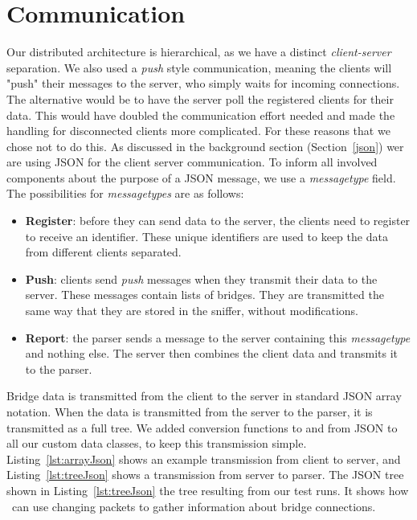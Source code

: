 \section{Communication}
\label{communication}
Our distributed architecture is hierarchical, as we have a distinct \textit{client-server} separation.
We also used a \textit{push} style communication, meaning the clients will "push" their messages to the server, who simply waits for incoming connections.
The alternative would be to have the server poll the registered clients for their data.
This would have doubled the communication effort needed and made the handling for disconnected clients more complicated.
For these reasons that we chose not to do this.
As discussed in the background section (Section~\ref{json}) wer are using JSON for the client server communication.
To inform all involved components about the purpose of a JSON message, we use a \textit{messagetype} field.
The possibilities for \textit{messagetypes} are as follows:
\begin{itemize}
    \item \textbf{Register}: before they can send data to the server, the clients need to register to receive an identifier.
        These unique identifiers are used to keep the data from different clients separated.
    \item \textbf{Push}: clients send \textit{push} messages when they transmit their data to the server.
        These messages contain lists of bridges.
        They are transmitted the same way that they are stored in the sniffer, without modifications.
    \item \textbf{Report}: the parser sends a message to the server containing this \textit{messagetype} and nothing else.
        The server then combines the client data and transmits it to the parser.
\end{itemize}
Bridge data is transmitted from the client to the server in standard JSON array notation.
When the data is transmitted from the server to the parser, it is transmitted as a full tree.
We added conversion functions to and from JSON to all our custom data classes, to keep this transmission simple.
Listing~\ref{lst:arrayJson} shows an example transmission from client to server, and Listing~\ref{lst:treeJson} shows a transmission from server to parser.
The JSON tree shown in Listing~\ref{lst:treeJson} the tree resulting from our test runs.
It shows how \tool\ can use changing packets to gather information about bridge connections.




